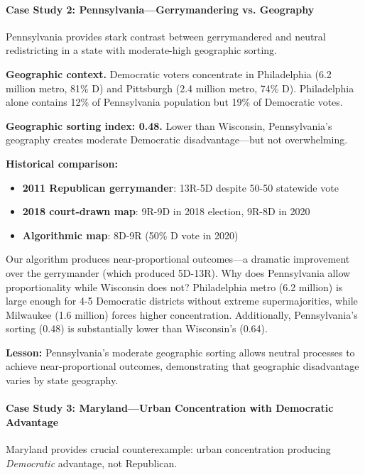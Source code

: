\paragraph{Case Study 2: Pennsylvania---Gerrymandering vs. Geography}

Pennsylvania provides stark contrast between gerrymandered and neutral redistricting in a state with moderate-high geographic sorting.

\textbf{Geographic context.} Democratic voters concentrate in Philadelphia (6.2 million metro, 81\% D) and Pittsburgh (2.4 million metro, 74\% D). Philadelphia alone contains 12\% of Pennsylvania population but 19\% of Democratic votes.

\textbf{Geographic sorting index: 0.48.} Lower than Wisconsin, Pennsylvania's geography creates moderate Democratic disadvantage---but not overwhelming.

\textbf{Historical comparison:}
\begin{itemize}
\item \textbf{2011 Republican gerrymander}: 13R-5D despite 50-50 statewide vote
\item \textbf{2018 court-drawn map}: 9R-9D in 2018 election, 9R-8D in 2020
\item \textbf{Algorithmic map}: 8D-9R (50\% D vote in 2020)
\end{itemize}

Our algorithm produces near-proportional outcomes---a dramatic improvement over the gerrymander (which produced 5D-13R). Why does Pennsylvania allow proportionality while Wisconsin does not? Philadelphia metro (6.2 million) is large enough for 4-5 Democratic districts without extreme supermajorities, while Milwaukee (1.6 million) forces higher concentration. Additionally, Pennsylvania's sorting (0.48) is substantially lower than Wisconsin's (0.64).

\textbf{Lesson:} Pennsylvania's moderate geographic sorting allows neutral processes to achieve near-proportional outcomes, demonstrating that geographic disadvantage varies by state geography.

\paragraph{Case Study 3: Maryland---Urban Concentration with Democratic Advantage}

Maryland provides crucial counterexample: urban concentration producing \textit{Democratic} advantage, not Republican.

